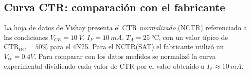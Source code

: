 \subsection{Curva CTR: comparación con el fabricante}
 
La hoja de datos de Vishay presenta el CTR \emph{normalizado} (NCTR) referenciado a las
condiciones $V_{CE}=\SI{10}{V}$, $I_F=\SI{10}{mA}$, $T_A=\SI{25}{\celsius}$, con un
valor típico de $\mathrm{CTR_{DC}}=50\%$ para el 4N25. Para el NCTR(SAT) el fabricante utilizó un $V_{ce}=0.4V$. Para comparar con los datos
medidos se normalizó la curva experimental dividiendo cada valor de CTR por el valor
obtenido a $I_F\approx\SI{10}{mA}$.
 
\begin{figure}[H]
    \centering
    

\end{figure}
